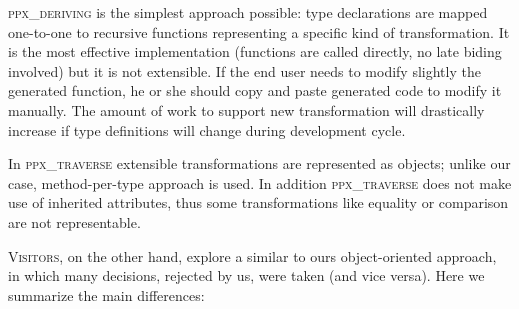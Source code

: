 \textsc{ppx\_deriving} is the simplest approach possible: type declarations are mapped one-to-one to recursive functions representing a specific kind of transformation. It is the most effective implementation (functions are called directly, no late biding involved) but it is not extensible. If the end user needs to modify slightly the generated function, he or she should copy and paste generated code to modify it manually. The amount of work to support new transformation will drastically increase if type definitions will change during development cycle.

In \textsc{ppx\_traverse} extensible transformations are represented as objects; unlike our case, method-per-type approach is used. In addition 
\textsc{ppx\_traverse} does not make use of inherited attributes, thus some transformations like equality or comparison are not representable.

\textsc{Visitors}, on the other hand, explore a similar to ours object-oriented approach, in which many decisions, rejected by us, were taken (and vice versa). Here
we summarize the main differences:

